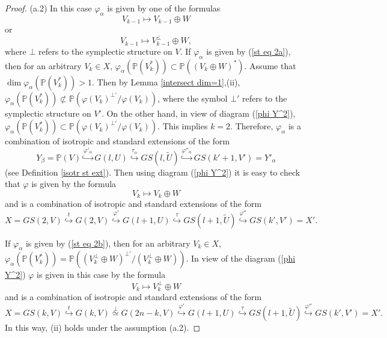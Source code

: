 \documentclass[12pt]{amsart}
\renewcommand{\phi}{\varphi}
\theoremstyle{definition}
\begin{document}
\begin{proof}
(a.2) In this case  $\phi_{\alpha}$ is given by one of the formulas
\begin{equation}\label{st eq 2a}
V_{k-1}\mapsto V_{k-1}\oplus W
\end{equation}
or
\begin{equation}\label{st eq 2b}
V_{k-1}\mapsto V^\bot_{k-1}\oplus W,
\end{equation}
where $\bot$ refers to the symplectic structure on $V$. If $\phi_{\alpha}$ is given by (\ref{st eq 2a}), then
for an arbitrary $V_k\in X$,
$\phi_{\alpha}(\mathbb{P}(V^*_k))\subset\mathbb{P}((V_k\oplus W)^*)$.
Assume that $\dim\phi_{\alpha}(\mathbb{P}(V^*_k))>1$. Then by Lemma \ref{intersect dim=1},(ii),
$\phi_{\alpha}(\mathbb{P}(V^*_k))\not\subset\mathbb{P}(\phi(V_k)^{\bot'}/\phi(V_k))$,
where the symbol $\bot'$ refers to the symplectic structure on $V'$.
On the other hand, in view of diagram
(\ref{phi Y^2}), $\phi_{\alpha}(\mathbb{P}(V^*_k))\subset\mathbb{P}(\phi(V_k)^{\bot'}/\phi(V_k))$.
This implies $k=2$. Therefore, $\phi_{\alpha}$ is a combination of isotropic and standard extensions of the form
$$
Y_{\beta}=\mathbb{P}(V)\overset{\phi'_{\alpha}}\hookrightarrow G(l,U)
\overset{\tau_{\alpha}}\hookrightarrow
GS(l,\tilde{U})\overset{\phi''_{\alpha}}\hookrightarrow GS(k'+1,V')=Y'_{\alpha}
$$
(see Definition \ref{isotr st ext}). Then using diagram (\ref{phi Y^2}) it is easy to check that $\phi$ is given by
the formula
$$
V_k\mapsto V_k\oplus W
$$
and is a combination of isotropic and standard extensions of the form
$$
X=GS(2,V)\overset{t}\hookrightarrow G(2,V)\overset{\phi'}\hookrightarrow G(l+1,U)
\overset{\tau}\hookrightarrow
GS(l+1,\tilde{U})\overset{\phi''}\hookrightarrow GS(k',V')=X'.
$$



If $\phi_{\alpha}$ is given by (\ref{st eq 2b}), then
for an arbitrary $V_k\in X$,
$\phi_{\alpha}(\mathbb{P}(V^*_k))=\mathbb{P}((V^\bot_k\oplus W)^{\bot'}/(V^\bot_k\oplus W))$.
In view of the diagram (\ref{phi Y^2}) $\phi$ is given in this case by the formula
$$
V_k\mapsto V^\bot_k\oplus W
$$
and is a combination of isotropic and standard extensions of the form
$$
X=GS(k,V)\overset{t}\hookrightarrow G(k,V)\overset{\bot}{\simeq}G(2n-k,V)\overset{\phi'}\hookrightarrow
G(l+1,U)\overset{\tau}\hookrightarrow GS(l+1,\tilde{U})\overset{\phi''}\hookrightarrow GS(k',V')=X'.
$$
In this way, (ii) holds under the assumption (a.2).



\end{proof}
\end{document}
